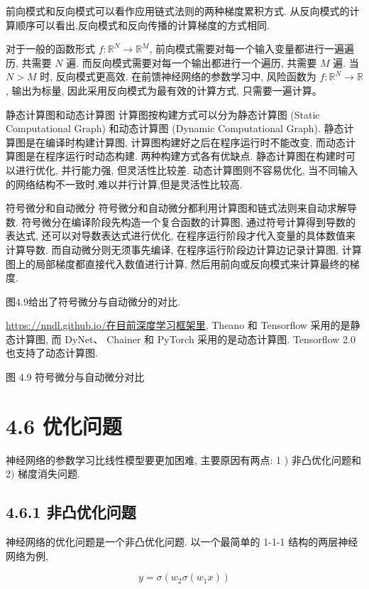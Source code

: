 \documentclass[10pt]{article}
\begin{document}
前向模式和反向模式可以看作应用链式法则的两种梯度累积方式. 从反向模式的计算顺序可以看出,反向模式和反向传播的计算梯度的方式相同.

对于一般的函数形式 $f: \mathbb{R}^{N} \rightarrow \mathbb{R}^{M}$, 前向模式需要对每一个输入变量都进行一遍遍历, 共需要 $N$ 遍. 而反向模式需要对每一个输出都进行一个遍历, 共需要 $M$ 遍. 当 $N>M$ 时, 反向模式更高效. 在前馈神经网络的参数学习中, 风险函数为 $f: \mathbb{R}^{N} \rightarrow \mathbb{R}$, 输出为标量, 因此采用反向模式为最有效的计算方式, 只需要一遍计算。

静态计算图和动态计算图 计算图按构建方式可以分为静态计算图 (Static Computational Graph) 和动态计算图 (Dynamic Computational Graph). 静态计算图是在编译时构建计算图, 计算图构建好之后在程序运行时不能改变, 而动态计算图是在程序运行时动态构建. 两种构建方式各有优缺点. 静态计算图在构建时可以进行优化, 并行能力强, 但灵活性比较差. 动态计算图则不容易优化, 当不同输入的网络结构不一致时,难以并行计算,但是灵活性比较高.

符号微分和自动微分 符号微分和自动微分都利用计算图和链式法则来自动求解导数. 符号微分在编译阶段先构造一个复合函数的计算图, 通过符号计算得到导数的表达式, 还可以对导数表达式进行优化, 在程序运行阶段才代入变量的具体数值来计算导数. 而自动微分则无须事先编译, 在程序运行阶段边计算边记录计算图, 计算图上的局部梯度都直接代入数值进行计算, 然后用前向或反向模式来计算最终的梯度.

图4.9给出了符号微分与自动微分的对比.

\href{https://nndl.github.io/%E5%9C%A8%E7%9B%AE%E5%89%8D%E6%B7%B1%E5%BA%A6%E5%AD%A6%E4%B9%A0%E6%A1%86%E6%9E%B6%E9%87%8C}{https://nndl.github.io/在目前深度学习框架里}, Theano 和 Tensorflow 采用的是静态计算图, 而 DyNet、 Chainer 和 PyTorch 采用的是动态计算图. Tensorflow 2.0 也支持了动态计算图.



图 4.9 符号微分与自动微分对比

\section*{4.6 优化问题}
神经网络的参数学习比线性模型要更加困难, 主要原因有两点: 1 ) 非凸优化问题和 2$)$ 梯度消失问题.

\subsection*{4.6.1 非凸优化问题}
神经网络的优化问题是一个非凸优化问题. 以一个最简单的 1-1-1 结构的两层神经网络为例,


\begin{equation*}
y=\sigma\left(w_{2} \sigma\left(w_{1} x\right)\right) \tag{4.90}
\end{equation*}
\end{document}
